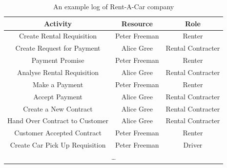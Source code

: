 \begin{table}[ht!]
\centering
\begin{tabular}{ | c | c | c | }
\hline
    \textbf{Activity} & \textbf{Resource} & \textbf{Role} \\ \hline
    Create Rental  Requisition & Peter Freeman & Renter \\ \hline
    Create Request for Payment & Alice Gree & Rental Contracter \\ \hline
    Payment Promise & Peter Freeman & Renter \\ \hline
    Analyse Rental Requisition & Alice Gree & Rental Contracter \\ \hline
    Make a Payment & Peter Freeman & Renter \\ \hline
    Accept Payment & Alice Gree & Rental Contracter \\ \hline
    Create a New Contract & Alice Gree & Rental Contracter \\ \hline
    Hand Over Contract to Customer & Alice Gree & Rental Contracter \\ \hline
    Customer Accepted Contract & Peter Freeman & Renter \\ \hline
    Create Car Pick Up  Requisition & Peter Freeman & Driver \\ \hline
    \multicolumn{3}{|c|}{\dots} \\ \hline
    
\end{tabular}
\caption{An example log of Rent-A-Car company}
\label{tab:rac-log}
  

\end{table}
